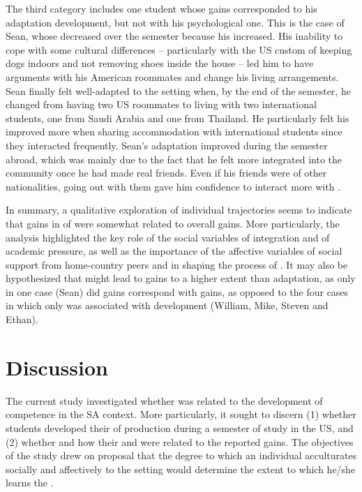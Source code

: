 \documentclass[output=paper]{langsci/langscibook}
\begin{document}
The third category includes one student whose  gains corresponded to his  adaptation development, but not with his psychological one. This is the case of Sean, whose  decreased over the semester because his  increased. His inability to cope with some cultural differences – particularly with the US custom of keeping dogs indoors and not removing shoes inside the house – led him to have arguments with his American roommates and change his living arrangements. Sean finally felt well-adapted to the setting when, by the end of the semester, he changed from having two US roommates to living with two international students, one from Saudi Arabia and one from Thailand. He particularly felt his  improved more when sharing accommodation with international students since they interacted frequently. Sean’s  adaptation improved during the semester abroad, which was mainly due to the fact that he felt more integrated into the  community once he had made real friends. Even if his friends were of other nationalities, going out with them gave him confidence to interact more with .

In summary, a qualitative exploration of individual trajectories seems to indicate that gains in  of  were somewhat related to overall  gains. More particularly, the analysis highlighted the key role of the social variables of integration and of academic pressure, as well as the importance of the affective variables of social support from home-country peers and  in shaping the process of . It may also be hypothesized that  might lead to  gains to a higher extent than  adaptation, as only in one case (Sean) did  gains correspond with  gains, as opposed to the four cases in which only  was associated with  development (William, Mike, Steven and Ethan).


\section{Discussion}
\largerpage
The current study investigated whether  was related to the development of  competence in the SA context. More particularly, it sought to discern (1) whether students developed their  of  production during a semester of study in the US, and (2) whether and how their  and  were related to the reported  gains. The objectives of the study drew on  proposal that the degree to which an individual acculturates socially and affectively to the  setting would determine the extent to which he/she learns the .
\end{document}
